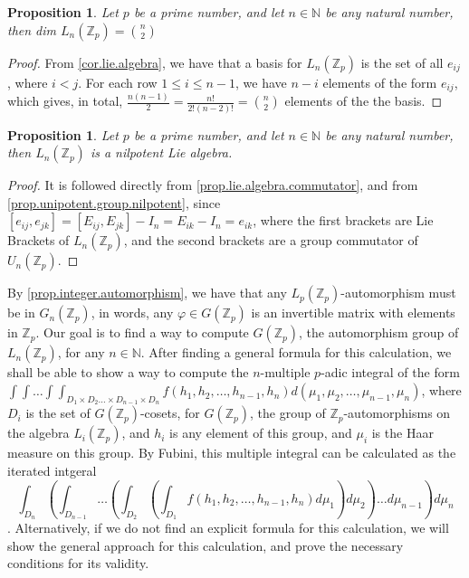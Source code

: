 \documentclass[12pt]{article}
\newtheorem{proposition}[theorem]{Proposition}
\begin{document}
\begin{proposition}
\label{prop.lie.algebra.dimension}
Let $p$ be a prime number, and let $n\in\mathbb{N}$ be any natural number, then dim $L_n(\mathbb{Z}_p)=\binom{n}{2}$
\end{proposition}
\begin{proof}
From \ref{cor.lie.algebra}, we have that a basis for $L_n(\mathbb{Z}_p)$ is the set of all $e_{ij}$, where $i<j$. For each row $1\leq i\leq n-1$, we have $n-i$ elements of the form $e_{ij}$, which gives, in total, $\frac{n(n-1)}{2}=\frac{n!}{2!(n-2)!}=\binom{n}{2}$ elements of the the basis.
\end{proof}
\begin{proposition}
\label{prop.nilpotent.lie.algebra}
Let $p$ be a prime number, and let $n\in\mathbb{N}$ be any natural number, then $L_n(\mathbb{Z}_p)$ is a nilpotent Lie algebra.
\end{proposition}
\begin{proof}
It is followed directly from \ref{prop.lie.algebra.commutator}, and from \ref{prop.unipotent.group.nilpotent}, since $[e_{ij},e_{jk}]=[E_{ij},E_{jk}]-I_n=E_{ik}-I
_n=e_{ik}$, where the first brackets are Lie Brackets of $L_n(\mathbb{Z}_p)$, and the second brackets are a group commutator of $U_n(\mathbb{Z}_p)$.
\end{proof}
By \ref{prop.integer.automorphism}, we have that any $L_p(\mathbb{Z}_p)$-automorphism must be in $G_n(\mathbb{Z}_p)$, in words, any $\varphi\in G(\mathbb{Z}_p)$ is an invertible matrix with elements in $\mathbb{Z}_p$. Our goal is to find a way to compute $G(\mathbb{Z}_p)$, the automorphism group of $L_n(\mathbb{Z}_p)$, for any $n\in\mathbb{N}$. After finding a general formula for this calculation, we shall be able to show a way to compute the $n$-multiple $p$-adic integral of the form $\displaystyle\int\int\dots\int\int_{D_1\times D_2\dots\times D_{n-1}\times D_n}f(h_1,h_2,\dots,h_{n-1},h_n)d(\mu_1,\mu_2,\dots,\mu_{n-1},\mu_n)$, where $D_i$ is the set of $G(\mathbb{Z}_p)$-cosets, for $G(\mathbb{Z}_p)$, the group of $\mathbb{Z}_p$-automorphisms on the algebra $L_i(\mathbb{Z}_p)$, and $h_i$ is any element of this group, and $\mu_i$ is the Haar measure on this group. By Fubini, this multiple integral can be calculated as the iterated intgeral $$\displaystyle\int_{D_n}\left(\int_{D_{n-1}}\dots\left(\int_{D_2}\left(\int_{D_1}f(h_1,h_2,\dots,h_{n-1},h_n)d\mu_1\right)d\mu_2\right)\dots d\mu_{n-1}\right)d\mu_n$$. Alternatively, if we do not find an explicit formula for this calculation, we will show the general approach for this calculation, and prove the necessary conditions for its validity. 
\end{document}
